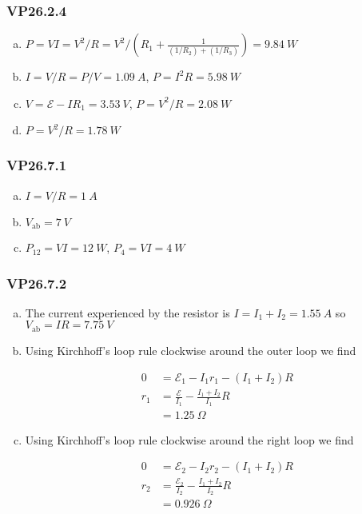 \documentclass{article}
\begin{document}
\subsubsection{VP26.2.4}

\begin{enumerate}[(a)]
  \item $P = V I = V^2 / R = V^2 / (R_1 + \frac{1}{(1 / R_2) + (1 / R_3)}) = \qty{9.84}{W}$

  \item $I = V / R = P / V = \qty{1.09}{A}$, $P = I^2 R = \qty{5.98}{W}$

  \item $V = \mathcal{E} - I R_1 = \qty{3.53}{V}$, $P = V^2 / R = \qty{2.08}{W}$

  \item $P = V^2 / R = \qty{1.78}{W}$
\end{enumerate}

\subsubsection{VP26.7.1}

\begin{enumerate}[(a)]
  \item $I = V / R = \qty{1}{A}$

  \item $V_\textrm{ab} = \qty{7}{V}$

  \item $P_{12} = V I = \qty{12}{W}$, $P_4 = V I = \qty{4}{W}$
\end{enumerate}

\subsubsection{VP26.7.2}

\begin{enumerate}[(a)]
  \item The current experienced by the resistor is $I = I_1 + I_2 = \qty{1.55}{A}$ so $V_\textrm{ab} = I R = \qty{7.75}{V}$

  \item Using Kirchhoff's loop rule clockwise around the outer loop we find

        \begin{align*}
          0   & = \mathcal{E}_1 - I_1 r_1 - (I_1 + I_2) R           \\
          r_1 & = \frac{\mathcal{E}}{I_1} - \frac{I_1 + I_2}{I_1} R \\
              & = \qty{1.25}{\Omega}
        \end{align*}

  \item Using Kirchhoff's loop rule clockwise around the right loop we find

        \begin{align*}
          0   & = \mathcal{E}_2 - I_2 r_2 - (I_1 + I_2) R             \\
          r_2 & = \frac{\mathcal{E}_2}{I_2} - \frac{I_1 + I_2}{I_2} R \\
              & = \qty{0.926}{\Omega}
        \end{align*}
\end{enumerate}
\end{document}
